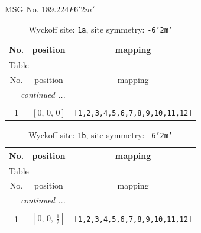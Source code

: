 \documentclass[fleqn,8pt]{jsarticle}
\begin{document}
\setcounter{MaxMatrixCols}{32}

\renewcommand{\tablename}{Table~}
\renewcommand{\figurename}{Figure~}
\begin{center}
\LARGE
MSG No. 189.224\quad$P\bar{6}'2m'$
\end{center}
\renewcommand{\arraystretch}{1.2}
\begin{longtable}{ccc}
\caption{Wyckoff site: {\tt 1a}, site symmetry: {\tt -6'2m'}}
 \\
 \hline \hline
No. & position & mapping \\ \hline \endfirsthead

\multicolumn{2}{l}{\tablename\ \thetable{}} \\
 \hline \hline
No. & position & mapping \\ \hline \endhead

 \hline \hline
\multicolumn{2}{r}{\footnotesize\it continued ...} \\ \endfoot

 \hline \hline
\multicolumn{2}{r}{} \\ \endlastfoot

1 & $\left[ 0,\, 0,\, 0 \right]$ & {\tt [1,2,3,4,5,6,7,8,9,10,11,12]} \\
\end{longtable}
\renewcommand{\arraystretch}{1.2}
\begin{longtable}{ccc}
\caption{Wyckoff site: {\tt 1b}, site symmetry: {\tt -6'2m'}}
 \\
 \hline \hline
No. & position & mapping \\ \hline \endfirsthead

\multicolumn{2}{l}{\tablename\ \thetable{}} \\
 \hline \hline
No. & position & mapping \\ \hline \endhead

 \hline \hline
\multicolumn{2}{r}{\footnotesize\it continued ...} \\ \endfoot

 \hline \hline
\multicolumn{2}{r}{} \\ \endlastfoot

1 & $\left[ 0,\, 0,\, \frac{1}{2} \right]$ & {\tt [1,2,3,4,5,6,7,8,9,10,11,12]} \\
\end{longtable}
\renewcommand{\arraystretch}{1.2}
\end{document}
